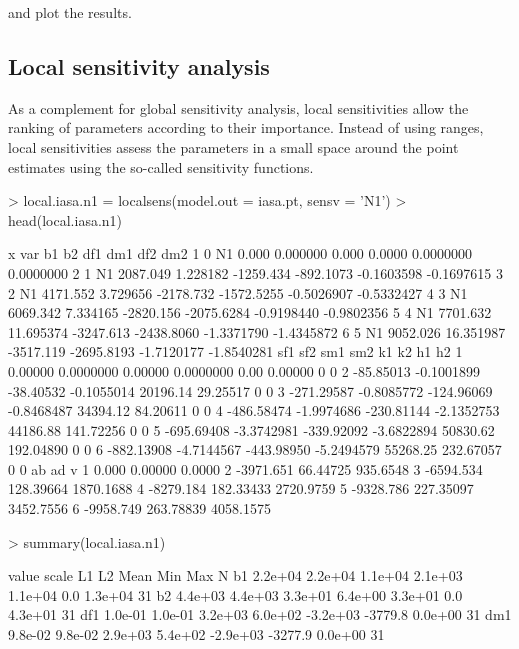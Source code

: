 \documentclass[a4paper]{article}
\begin{document}
and plot the results.
\subsection{Local sensitivity analysis}
As a complement for global sensitivity analysis, local sensitivities allow the ranking of parameters according to their importance. Instead of using ranges, local sensitivities assess the parameters in a small space around the point estimates using the so-called sensitivity functions.

\begin{Schunk}
\begin{Sinput}
> local.iasa.n1 = localsens(model.out = iasa.pt, sensv = 'N1')
> head(local.iasa.n1)
\end{Sinput}
\begin{Soutput}
  x var       b1        b2       df1        dm1        df2        dm2
1 0  N1    0.000  0.000000     0.000     0.0000  0.0000000  0.0000000
2 1  N1 2087.049  1.228182 -1259.434  -892.1073 -0.1603598 -0.1697615
3 2  N1 4171.552  3.729656 -2178.732 -1572.5255 -0.5026907 -0.5332427
4 3  N1 6069.342  7.334165 -2820.156 -2075.6284 -0.9198440 -0.9802356
5 4  N1 7701.632 11.695374 -3247.613 -2438.8060 -1.3371790 -1.4345872
6 5  N1 9052.026 16.351987 -3517.119 -2695.8193 -1.7120177 -1.8540281
         sf1        sf2        sm1        sm2       k1        k2 h1 h2
1    0.00000  0.0000000    0.00000  0.0000000     0.00   0.00000  0  0
2  -85.85013 -0.1001899  -38.40532 -0.1055014 20196.14  29.25517  0  0
3 -271.29587 -0.8085772 -124.96069 -0.8468487 34394.12  84.20611  0  0
4 -486.58474 -1.9974686 -230.81144 -2.1352753 44186.88 141.72256  0  0
5 -695.69408 -3.3742981 -339.92092 -3.6822894 50830.62 192.04890  0  0
6 -882.13908 -4.7144567 -443.98950 -5.2494579 55268.25 232.67057  0  0
         ab        ad         v
1     0.000   0.00000    0.0000
2 -3971.651  66.44725  935.6548
3 -6594.534 128.39664 1870.1688
4 -8279.184 182.33433 2720.9759
5 -9328.786 227.35097 3452.7556
6 -9958.749 263.78839 4058.1575
\end{Soutput}
\begin{Sinput}
> summary(local.iasa.n1)
\end{Sinput}
\begin{Soutput}
      value   scale      L1      L2     Mean      Min     Max  N
b1  2.2e+04 2.2e+04 1.1e+04 2.1e+03  1.1e+04      0.0 1.3e+04 31
b2  4.4e+03 4.4e+03 3.3e+01 6.4e+00  3.3e+01      0.0 4.3e+01 31
df1 1.0e-01 1.0e-01 3.2e+03 6.0e+02 -3.2e+03  -3779.8 0.0e+00 31
dm1 9.8e-02 9.8e-02 2.9e+03 5.4e+02 -2.9e+03  -3277.9 0.0e+00 31

\end{Soutput}
\end{Schunk}
\end{document}

